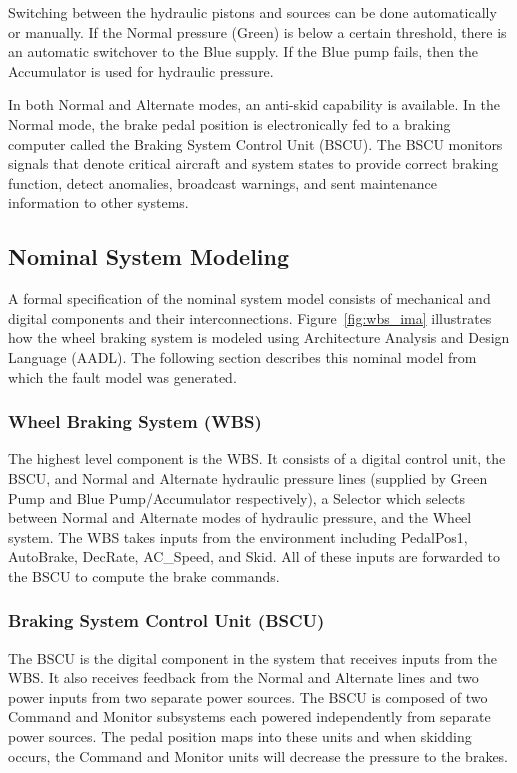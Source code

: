Switching between the hydraulic pistons and sources can be done automatically or manually. If the Normal pressure (Green) is below a certain threshold, there is an automatic switchover to the Blue supply. If the Blue pump fails, then the Accumulator is used for hydraulic pressure. 

In both Normal and Alternate modes, an anti-skid capability is available. In the Normal mode, the brake pedal position is electronically fed to a braking computer called the Braking System Control Unit (BSCU). The BSCU monitors signals that denote critical aircraft and system states to provide correct braking function, detect anomalies, broadcast warnings, and sent maintenance information to other systems. 

\subsection{Nominal System Modeling}
A formal specification of the nominal system model consists of mechanical and digital components and their interconnections. Figure~\ref{fig:wbs_ima} illustrates how the wheel braking system is modeled using Architecture Analysis and Design Language (AADL). The following section describes this nominal model from which the fault model was generated. 

\subsubsection{Wheel Braking System (WBS)}
The highest level component is the WBS. It consists of a digital control unit, the BSCU, and Normal and Alternate hydraulic pressure lines (supplied by Green Pump and Blue Pump/Accumulator respectively), a Selector which selects between Normal and Alternate modes of hydraulic pressure, and the Wheel system. The WBS takes inputs from the environment including PedalPos1, AutoBrake, DecRate, AC\_Speed, and Skid. All of these inputs are forwarded to the BSCU to compute the brake commands.

\subsubsection{Braking System Control Unit (BSCU)}
The BSCU is the digital component in the system that receives inputs from the WBS. It also receives feedback from the Normal and Alternate lines and two power inputs from two separate power sources. The BSCU is composed of two Command and Monitor subsystems each powered independently from separate power sources. The pedal position maps into these units and when skidding occurs, the Command and Monitor units will decrease the pressure to the brakes. 

